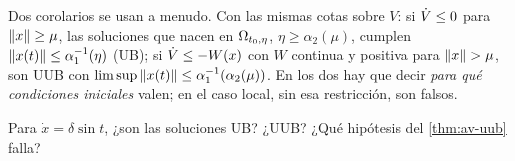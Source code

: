 Dos corolarios se usan a menudo. Con las mismas cotas sobre $V$: si $\dot V\le0$ para $\left\lVert x\right\rVert\ge\mu$, las soluciones que nacen en $\Omega_{t_0,\eta}$, $\eta\ge\alpha_2(\mu)$, cumplen $\left\lVert x(t)\right\rVert\le\alpha_1^{-1}(\eta)$ (UB); si $\dot V\le-W(x)$ con $W$ continua y positiva para $\left\lVert x\right\rVert>\mu$, son UUB con $\limsup\left\lVert x(t)\right\rVert\le\alpha_1^{-1}(\alpha_2(\mu))$. En los dos hay que decir \emph{para qué condiciones iniciales} valen; en el caso local, sin esa restricción, son falsos.

\begin{pausa}
Para $\dot x=\delta\sin t$, ¿son las soluciones UB? ¿UUB? ¿Qué hipótesis del \cref{thm:av-uub} falla?
\end{pausa}
